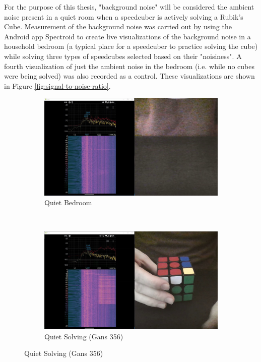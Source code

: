 For the purpose of this thesis, "background noise" will be considered the ambient noise present in a quiet room when a speedcuber is actively solving a Rubik's Cube.
Measurement of the background noise was carried out by using the Android app Spectroid \cite{googleplay-spectroid} to create live visualizations of the background noise in a household bedroom (a typical place for a speedcuber to practice solving the cube) while solving three types of speedcubes selected based on their "noisiness".
A fourth visualization of just the ambient noise in the bedroom (i.e. while no cubes were being solved) was also recorded as a control.
These visualizations are shown in Figure \ref{fig:signal-to-noise-ratio}.

\begin{figure}
    \centering
    \begin{subfigure}{\textwidth}
        \centering
        \includegraphics[width=\linewidth]{Figures/4 Protocol Design/Signal to Noise Ratio/silent_background_noise.jpg}
        \caption{Quiet Bedroom}
        \label{fig:signal-to-noise-ratio-silent}
    \end{subfigure}\\
    \begin{subfigure}{\textwidth}
        \centering
        \includegraphics[width=\linewidth]{Figures/4 Protocol Design/Signal to Noise Ratio/356_background_noise.jpg}
        \caption{Quiet Solving (Gans 356)}
        \label{fig:signal-to-noise-ratio-356}
    \end{subfigure}
\end{figure}
